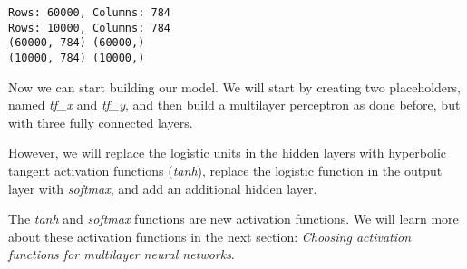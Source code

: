 \documentclass[11pt]{article}
\begin{document}
    \begin{Verbatim}[commandchars=\\\{\}]
Rows: 60000, Columns: 784
Rows: 10000, Columns: 784
(60000, 784) (60000,)
(10000, 784) (10000,)

    \end{Verbatim}

    Now we can start building our model. We will start by creating two
placeholders, named \emph{tf\_x} and \emph{tf\_y}, and then build a
multilayer perceptron as done before, but with three fully connected
layers.

However, we will replace the logistic units in the hidden layers with
hyperbolic tangent activation functions (\emph{tanh}), replace the
logistic function in the output layer with \emph{softmax}, and add an
additional hidden layer.

The \emph{tanh} and \emph{softmax} functions are new activation
functions. We will learn more about these activation functions in the
next section: \emph{Choosing activation functions for multilayer neural
networks}.
\end{document}
